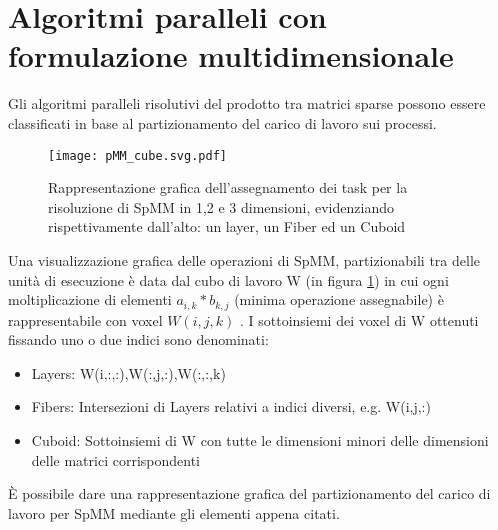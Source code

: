 \section{Algoritmi paralleli con formulazione multidimensionale} 
Gli algoritmi paralleli risolutivi del prodotto tra matrici sparse possono essere
classificati in base al partizionamento del carico di lavoro sui processi.\\
\begin{figure}[H]
  \centering \texttt{[image: pMM\_cube.svg.pdf]} 
  \caption[cubo di lavoro per SpMM]
  {Rappresentazione grafica dell'assegnamento dei task per la risoluzione
      di SpMM in 1,2 e 3 dimensioni, evidenziando rispettivamente dall'alto: un layer, un Fiber ed un Cuboid}\decoRule \label{fig:pMM_cube}
\end{figure}
Una visualizzazione grafica delle operazioni di SpMM, partizionabili tra delle unità di esecuzione
è data dal cubo di lavoro W (in figura \ref{fig:pMM_cube})
in cui ogni moltiplicazione di elementi \nnz $a_{i,k}*b_{k,j}$ (minima operazione assegnabile) 
è rappresentabile con voxel $W(i,j,k)$ \cite{cartesianPartitioningModels}.
\voidLine
\label{ChExistingTecqs:workCube}
I sottoinsiemi dei voxel di W ottenuti fissando uno o due indici sono denominati:
\begin{itemize}
  \item Layers: W(i,:,:),W(:,j,:),W(:,:,k)
  \item Fibers: Intersezioni di Layers relativi a indici diversi, e.g. W(i,j,:)
  \item Cuboid: Sottoinsiemi di W con tutte le dimensioni minori delle 
   dimensioni delle matrici corrispondenti
\end{itemize}
È possibile dare una rappresentazione grafica del partizionamento del carico di lavoro per SpMM 
mediante gli elementi appena citati.\\

